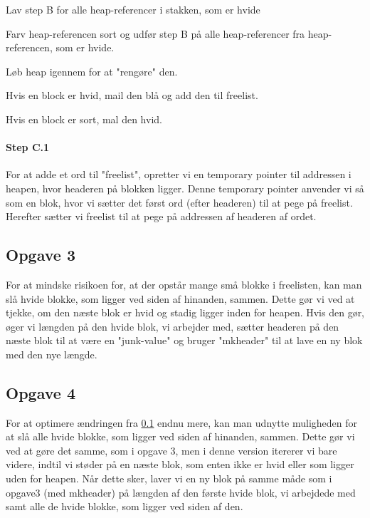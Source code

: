 \begin{my_description}
\item[Step A] Lav step B for alle heap-referencer i stakken, som er hvide
\item[Step B] Farv heap-referencen sort og udfør step B på alle heap-referencer fra heap-referencen, som er hvide.
\item[Step C] Løb heap igennem for at "rengøre" den.
	\begin{my_description}
	\item[Step C.1] Hvis en block er hvid, mail den blå og add den til freelist.
	\item[Step C.2] Hvis en block er sort, mal den hvid.
	\end{my_description}
\end{my_description}

\paragraph{Step C.1}
For at adde et ord til "freelist", opretter vi en temporary pointer til addressen i heapen, hvor headeren på blokken ligger. Denne temporary pointer anvender vi så som en blok, hvor vi sætter det først ord (efter headeren) til at pege på freelist. Herefter sætter vi freelist til at pege på addressen af headeren af ordet.

\subsection{Opgave 3}
\label{O2_3}
For at mindske risikoen for, at der opstår mange små blokke i freelisten, kan man slå hvide blokke, som ligger ved siden af hinanden, sammen. Dette gør vi ved at tjekke, om den næste blok er hvid og stadig ligger inden for heapen. Hvis den gør, øger vi længden på den hvide blok, vi arbejder med, sætter headeren på den næste blok til at være en "junk-value" og bruger "mkheader" til at lave en ny blok med den nye længde.
 
\subsection{Opgave 4}
\label{O2_4}
For at optimere ændringen fra \ref{O2_3} endnu mere, kan man udnytte muligheden for at slå alle hvide blokke, som ligger ved siden af hinanden, sammen. Dette gør vi ved at gøre det samme, som i opgave 3, men i denne version itererer vi bare videre, indtil vi støder på en næste blok, som enten ikke er hvid eller som ligger uden for heapen. Når dette sker, laver vi en ny blok på samme måde som i opgave3 (med mkheader) på længden af den første hvide blok, vi arbejdede med samt alle de hvide blokke, som ligger ved siden af den.

